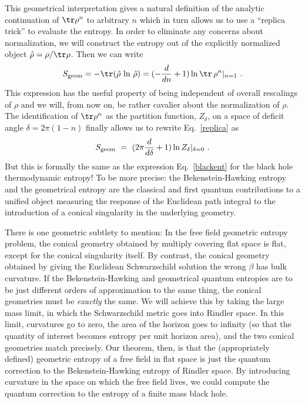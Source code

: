 \documentclass[12pt]{article}
\begin{document}
This geometrical interpretation gives a natural definition of the analytic
continuation of $\tr\rho^n$ to arbitrary $n$ which in turn allows us to
use
a ``replica trick'' to evaluate the entropy. In order to eliminate any concerns
about normalization, we will construct the entropy out of the explicitly
normalized object $\hat\rho = \rho/\tr\rho$. Then we can write
\begin{equation}
S_{\rm geom} = -\tr(\hat\rho\, \ln\, \hat\rho) =
(-{d\over dn} + 1) \ln \tr\,\rho^n |_{n=1}~.
\label{replica}
\end{equation}
This expression has the useful property of being independent of overall
rescalings of $\rho$ and we will, from now on, be rather cavalier about the
normalization of $\rho$. The identification of $\tr\rho^n$ as the
partition
function, $Z_\delta$, on a space of deficit angle $\delta=2\pi(1-n)$ finally
allows us to rewrite Eq.~\ref{replica} as
\begin{equation}
S_{\rm geom}~=~(2\pi{d\over d\delta} +1) \ln Z_\delta |_{\delta=0}~.
\label{reptodef}
\end{equation}
But this is formally the same as the expression Eq.~\ref{blackent} for the black
hole thermodynamic entropy! To be more precise:  the Bekenstein-Hawking
entropy and the geometrical entropy are the classical and first
quantum contributions to a unified object measuring the response of the
Euclidean path integral to the introduction of a conical singularity in the
underlying geometry.

There is one geometric subtlety to mention: In the free field geometric entropy
problem, the conical geometry obtained by multiply covering flat space is
flat, except for the conical singularity itself.
By contrast, the conical geometry obtained by giving the Euclidean
Schwarzschild solution the wrong $\beta$ has bulk curvature. If the
Bekenstein-Hawking and geometrical quantum entropies are to be just different
orders of approximation to the same thing, the conical geometries must be
{\it exactly} the same. We will achieve this by taking the large mass limit,
in which the Schwarzschild metric goes into Rindler space. In this limit,
curvatures go to zero, the area of the horizon goes to infinity (so that the
quantity of interest becomes entropy per unit horizon area), and the two
conical geometries match precisely. Our theorem, then, is that the
(appropriately defined) geometric entropy of a free field in flat space is just
the quantum correction to the Bekenstein-Hawking entropy of Rindler space.
By introducing curvature in the space on which the free field lives, we could
compute the quantum correction to the entropy of a finite mass black hole.
\end{document}
